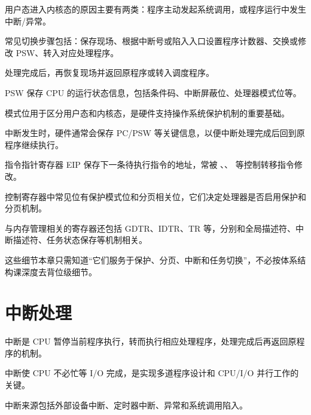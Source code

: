 \begin{points}
  \item 用户态进入内核态的原因主要有两类：程序主动发起系统调用，或程序运行中发生中断/异常。
  \item 常见切换步骤包括：保存现场、根据中断号或陷入入口设置程序计数器、交换或修改 PSW、转入对应处理程序。
  \item 处理完成后，再恢复现场并返回原程序或转入调度程序。
\end{points}


\begin{points}
  \item PSW 保存 CPU 的运行状态信息，包括条件码、中断屏蔽位、处理器模式位等。
  \item 模式位用于区分用户态和内核态，是硬件支持操作系统保护机制的重要基础。
  \item 中断发生时，硬件通常会保存 PC/PSW 等关键信息，以便中断处理完成后回到原程序继续执行。
\end{points}


\begin{points}
  \item 指令指针寄存器 EIP 保存下一条待执行指令的地址，常被 、、 等控制转移指令修改。
  \item 控制寄存器中常见位有保护模式位和分页相关位，它们决定处理器是否启用保护和分页机制。
  \item 与内存管理相关的寄存器还包括 GDTR、IDTR、TR 等，分别和全局描述符、中断描述符、任务状态保存等机制相关。
  \item 这些细节本章只需知道“它们服务于保护、分页、中断和任务切换”，不必按体系结构课深度去背位级细节。
\end{points}


\section{中断处理}
\begin{points}
  \item 中断是 CPU 暂停当前程序执行，转而执行相应处理程序，处理完成后再返回原程序的机制。
  \item 中断使 CPU 不必忙等 I/O 完成，是实现多道程序设计和 CPU/I/O 并行工作的关键。
  \item 中断来源包括外部设备中断、定时器中断、异常和系统调用陷入。
\end{points}

